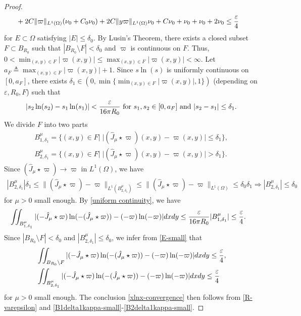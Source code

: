 \documentclass[1 [leqno, 11pt]{amsart}
\numberwithin{equation}{section}
\begin{document}
\begin{CJK*}{GBK}{song}
\begin{appendix}
\begin{proof}
\begin{align}
&+2C\|\varpi\|_{L^1(\Omega)}(\nu_0+C_0\nu_0)
+2C\|y\varpi\|_{L^1(\Omega)}\nu_0
+C\nu_0+\nu_0+\nu_0+2\nu_0
\leq {\varepsilon\over 4}
\end{align}
for   $E\subset \Omega$ satisfying $|E|\leq\delta_0$.  By Lusin's Theorem, there exists a closed subset $F\subset B_{R_0}$ such that $|B_{R_0}\setminus F|<\delta_0$ and $\varpi$ is continuous on $F$. Thus, $0< \min_{(x,y)\in F}|\varpi(x,y)|\leq \max_{(x,y)\in F}|\varpi(x,y)|<\infty$. Let  $a_F\triangleq \max_{(x,y)\in F}|\varpi(x,y)|+1$.
Since $s\ln(s)$ is uniformly continuous on $[0,a_F]$, there exists $\delta_1\in(0,\min\{\min_{(x,y)\in F}|\varpi(x,y)|,1\})$ (depending on $\varepsilon, R_0, F$) such that
\begin{align}\label{uniform continuity}
|s_2\ln(s_2)-s_1\ln(s_1)|<{\varepsilon\over 16\pi R_0} \text{ for }s_1,s_2\in[0,a_F] \text{ and }|s_2-s_1|\leq\delta_1.
\end{align}
We divide $F$ into two parts
\begin{align*}
B_{1,\delta_1}^{\mu}=\{(x,y)\in  F|\;|(\hat J_\mu\star\varpi)(x,y)-\varpi(x,y)|\leq \delta_1\},\\
B_{2,\delta_1}^{\mu}=\{(x,y)\in  F|\;|(\hat J_\mu\star\varpi)(x,y)-\varpi(x,y)|> \delta_1\}.
\end{align*}
Since $(\hat J_\mu\star\varpi)\to\varpi$ in $L^1(\Omega)$, we have
\begin{align*}
|B_{2,\delta_1}^{\mu}|\delta_1\leq\|(\hat J_\mu\star\varpi)-\varpi\|_{L^1(B_{2,\delta_1}^{\mu})}\leq \|(\hat J_\mu\star\varpi)-\varpi\|_{L^1(\Omega)}\leq \delta_0\delta_1\Longrightarrow|B_{2,\delta_1}^{\mu}|\leq \delta_0
\end{align*}
for $\mu>0$ small enough. By \eqref{uniform continuity}, we have
\begin{align}\label{B1delta1kappa-small}
&\iint_{B_{1,\delta_1}^{\mu}}|(-\hat J_{\mu}\star\varpi)\ln(-(\hat J_{\mu}\star\varpi))-(-\varpi)\ln(-\varpi)|dxdy
\leq {\varepsilon\over 16\pi R_0}|B_{1,\delta_1}^{\mu}|\leq{\varepsilon\over 4}.
\end{align}
Since $|B_{R_0}\setminus F|<\delta_0$ and
$|B_{2,\delta_1}^{\mu}|\leq \delta_0$,  we infer from \eqref{E-small} that
\begin{align}\label{BR0setminusF-small}
&\iint_{B_{R_0}\setminus F}|(-\hat J_{\mu}\star\varpi)\ln(-(\hat J_{\mu}\star\varpi))-(-\varpi)\ln(-\varpi)|dxdy
\leq {\varepsilon\over 4},\\\label{B2delta1kappa-small}
&\iint_{B_{2,\delta_1}^{\mu}}|(-\hat J_{\mu}\star\varpi)\ln(-(\hat J_{\mu}\star\varpi))-(-\varpi)\ln(-\varpi)|dxdy
\leq {\varepsilon\over 4}
\end{align}
for $\mu>0$ small enough. The conclusion \eqref{xlnx-convergence} then follows from
\eqref{R-varepsilon} and \eqref{B1delta1kappa-small}-\eqref{B2delta1kappa-small}.
\end{proof}


\end{appendix}
\end{CJK*}
\end{document}
